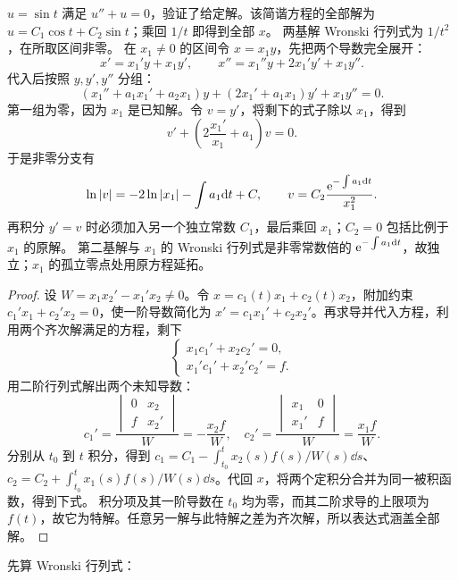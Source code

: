 $u=\sin t$ 满足 $u''+u=0$，验证了给定解。该简谐方程的全部解为 $u=C_1\cos t+C_2\sin t$；乘回 $1/t$ 即得到全部 $x$。
两基解 Wronski 行列式为 $1/t^2$，在所取区间非零。
在 $x_1\ne0$ 的区间令 $x=x_1y$，先把两个导数完全展开：
\[
x'=x_1'y+x_1y',\qquad x''=x_1''y+2x_1'y'+x_1y''.
\]
代入后按照 $y,y',y''$ 分组：
\[
(x_1''+a_1x_1'+a_2x_1)y+(2x_1'+a_1x_1)y'+x_1y''=0.
\]
第一组为零，因为 $x_1$ 是已知解。令 $v=y'$，将剩下的式子除以 $x_1$，得到
\[
v'+\left(2\dfrac{x_1'}{x_1}+a_1\right)v=0.
\]
于是非零分支有
\[
\ln|v|=-2\ln|x_1|-\int a_1\mathrm d t+C,
\qquad v=C_2\dfrac{\mathrm e^{-\int a_1\mathrm d t}}{x_1^2}.
\]
再积分 $y'=v$ 时必须加入另一个独立常数 $C_1$，最后乘回 $x_1$；$C_2=0$ 包括比例于 $x_1$ 的原解。
第二基解与 $x_1$ 的 Wronski 行列式是非零常数倍的 $\displaystyle \mathrm e^{-\int a_1\mathrm d t}$，故独立；$x_1$ 的孤立零点处用原方程延拓。
\begin{proof}
设 $W=x_1x_2'-x_1'x_2\ne0$。令 $x=c_1(t)x_1+c_2(t)x_2$，附加约束 $c_1'x_1+c_2'x_2=0$，使一阶导数简化为 $x'=c_1x_1'+c_2x_2'$。再求导并代入方程，利用两个齐次解满足的方程，剩下
\[
\begin{cases}
x_1c_1'+x_2c_2'=0,\\
x_1'c_1'+x_2'c_2'=f.
\end{cases}
\]
用二阶行列式解出两个未知导数：
\[
c_1'=\dfrac{\begin{vmatrix}0&x_2\\f&x_2'\end{vmatrix}}W=-\dfrac{x_2f}W,
\quad
c_2'=\dfrac{\begin{vmatrix}x_1&0\\x_1'&f\end{vmatrix}}W=\dfrac{x_1f}W.
\]
分别从 $t_0$ 到 $t$ 积分，得到 $\displaystyle c_1=C_1-\int_{t_0}^t x_2(s)f(s)/W(s)\dd s$、$\displaystyle c_2=C_2+\int_{t_0}^t x_1(s)f(s)/W(s)\dd s$。代回 $x$，将两个定积分合并为同一被积函数，得到下式。
积分项及其一阶导数在 $t_0$ 均为零，而其二阶求导的上限项为 $f(t)$，故它为特解。任意另一解与此特解之差为齐次解，所以表达式涵盖全部解。
\end{proof}
先算 Wronski 行列式：
